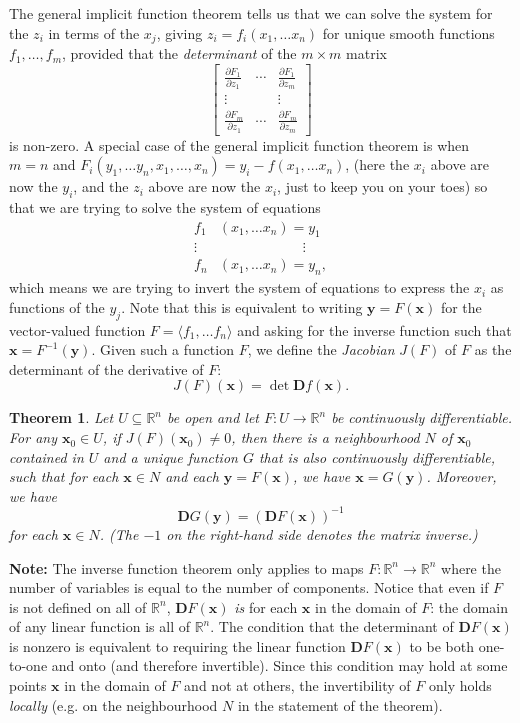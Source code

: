 \documentclass[12pt,letterpaper]{article}
\newtheorem{theorem}{Theorem}[section]
\newcommand{\R}{\mathbb{R}}
\newcommand{\D}{\mathbf{D}}
\newcommand{\x}{\mathbf{x}}
\newcommand{\y}{\mathbf{y}}
\begin{document}
The general implicit function theorem tells us that we can solve the system for the $z_i$ in terms of the $x_j$, giving $z_i = f_i(x_1,\ldots x_n)$ for unique smooth functions $f_1,\ldots, f_m$, provided that the {\em determinant} of the $m\times m$ matrix
\[
\begin{bmatrix} \frac{\partial F_1}{\partial z_1} & \cdots & \frac{\partial F_1}{\partial z_m}\\
\vdots & & \vdots \\
\frac{\partial F_m}{\partial z_1}& \cdots & \frac{\partial F_m}{\partial z_m}\end{bmatrix}
\]
is non-zero. A special case of the general implicit function theorem is when $m=n$ and $F_i(y_1,\ldots y_n,x_1,\ldots, x_n) = y_i-f(x_1,\ldots x_n)$, (here the $x_i$ above are now the $y_i$, and the $z_i$ above are now the $x_i$, just to keep you on your toes) so that we are trying to solve the system of equations
\begin{align*}
f_1 &(x_1,\ldots x_n)  = y_1\\
 \vdots &  \hspace{1in}\vdots\\
f_n &(x_1,\ldots x_n)  = y_n,
\end{align*}
which means we are trying to invert the system of equations to express the $x_i$ as functions of the $y_j$. Note that this is equivalent to writing $\y=F(\x)$ for the vector-valued function $F=\langle f_1,\ldots f_n\rangle$ and asking for the inverse function such that $\x = F^{-1}(\y)$. Given such a function $F$, we define the {\em Jacobian} $J(F)$ of $F$ as the determinant of the derivative of $F$:
\[
J(F)(\x) = \det \D f(\x).
\]
\begin{theorem}
Let $U\subseteq \R^n$ be open and let $F:U\to \R^n$ be continuously differentiable. For any $\x_0\in U$, if $J(F)(\x_0)\neq 0$, then there is a neighbourhood $N$ of $\x_0$ contained in $U$ and a unique function $G$ that is also continuously differentiable, such that for each $\x\in N$ and each $\y=F(\x)$, we have $\x = G(\y)$. Moreover, we have
\[
\D G(\y) = (\D F(\x))^{-1}
\]
for each $\x\in N$. (The $-1$ on the right-hand side denotes the matrix inverse.)
\end{theorem}

{\bf Note:} The inverse function theorem only applies to maps $F:\R^n\to \R^n$ where the number of variables is equal to the number of components. Notice that even if $F$ is not defined on all of $\R^n$, $\D F(\x)$ {\em is} for each $\x$ in the domain of $F$: the domain of any linear function is all of $\R^n$. The condition that the determinant of $\D F(\x)$ is nonzero is equivalent to requiring the linear function $\D F(\x)$ to be both one-to-one and onto (and therefore invertible). Since this condition may hold at some points $\x$ in the domain of $F$ and not at others, the invertibility of $F$ only holds {\em locally} (e.g. on the neighbourhood $N$ in the statement of the theorem).
\end{document}
